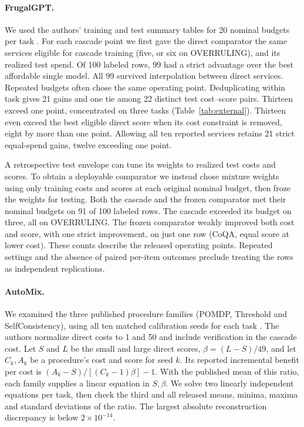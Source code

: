 \paragraph{FrugalGPT.} We used the authors' training and test summary tables for 20 nominal budgets per task \cite{frugal}. For each cascade point we first gave the direct comparator the same services eligible for cascade training (five, or six on OVERRULING), and its realized test spend. Of 100 labeled rows, 99 had a strict advantage over the best affordable single model. All 99 survived interpolation between direct services. Repeated budgets often chose the same operating point. Deduplicating within task gives 21 gains and one tie among 22 distinct test cost--score pairs. Thirteen exceed one point, concentrated on three tasks (Table~\ref{tab:external}). Thirteen even exceed the best eligible direct score when its cost constraint is removed, eight by more than one point. Allowing all ten reported services retains 21 strict equal-spend gains, twelve exceeding one point.

\begin{table}[htbp]\centering\small
\caption{FrugalGPT test gains over an affordable query-independent mixture of training-eligible direct services. Counts are distinct within-task cost--score coordinates. Each task's configurations share its test questions.}\label{tab:external}

\end{table}

A retrospective test envelope can tune its weights to realized test costs and scores. To obtain a deployable comparator we instead chose mixture weights using only training costs and scores at each original nominal budget, then froze the weights for testing. Both the cascade and the frozen comparator met their nominal budgets on 91 of 100 labeled rows. The cascade exceeded its budget on three, all on OVERRULING. The frozen comparator weakly improved both cost and score, with one strict improvement, on just one row (CoQA, equal score at lower cost). These counts describe the released operating points. Repeated settings and the absence of paired per-item outcomes preclude treating the rows as independent replications.

\paragraph{AutoMix.} We examined the three published procedure families (POMDP, Threshold and SelfConsistency), using all ten matched calibration seeds for each task \cite{automix}. The authors normalize direct costs to 1 and 50 and include verification in the cascade cost. Let $S$ and $L$ be the small and large direct scores, $\beta=(L-S)/49$, and let $C_k,A_k$ be a procedure's cost and score for seed $k$. Its reported incremental benefit per cost is $(A_k-S)/[(C_k-1)\beta]-1$. With the published mean of this ratio, each family supplies a linear equation in $S,\beta$. We solve two linearly independent equations per task, then check the third and all released means, minima, maxima and standard deviations of the ratio. The largest absolute reconstruction discrepancy is below $2\times10^{-14}$.


